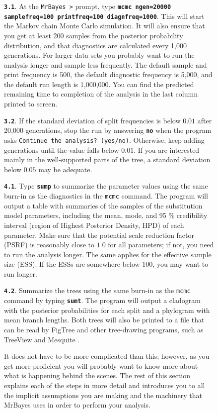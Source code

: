 \documentclass[12pt]{book}
\newcommand{\ttt}[1]{\texttt{#1}}
\newcommand{\tb}[1]{\ttt{\textbf{#1}}}
\begin{document}
\begin{figure}[h]
\tb{3.1}. At the \ttt{MrBayes >} prompt, type \tb{mcmc ngen=20000 samplefreq=100 printfreq=100
diagnfreq=1000}. This will start the Markov chain Monte Carlo simulation. It will also ensure that
you get at least 200 samples from the posterior probability distribution, and that diagnostics are
calculated every 1,000 generations. For larger data sets you probably want to run the analysis
longer and sample less frequently. The default sample and print frequency is 500, the default
diagnostic frequency is 5,000, and the default run length is 1,000,000. You can find the predicted
remaining time to completion of the analysis in the last column printed to screen.

\tb{3.2}. If the standard deviation of split frequencies is below $0.01$ after 20,000 generations,
stop the run by answering \tb{no} when the program asks \ttt{Continue the analysis? (yes/no)}.
Otherwise, keep adding generations until the value falls below $0.01$. If you are interested mainly
in the well-supported parts of the tree, a standard deviation below $0.05$ may be adequate.

\tb{4.1}. Type \tb{sump} to summarize the parameter values using the same burn-in as the
diagnostics in the \ttt{mcmc} command. The program will output a table with summaries of the
samples of the substitution model parameters, including the mean, mode, and 95 \% credibility
interval (region of Highest Posterior Density, HPD) of each parameter. Make sure that the potential
scale reduction factor (PSRF) is reasonably close to $1.0$ for all parameters; if not, you need to
run the analysis longer. The same applies for the effective sample size (ESS). If the ESSs are
somewhere below 100, you may want to run longer.

\tb{4.2}. Summarize the trees using the same burn-in as the \ttt{mcmc} command by typing \tb{sumt}.
The program will output a cladogram with the posterior probabilities for each split and a phylogram
with mean branch lengths. Both trees will also be printed to a file that can be read by FigTree
\citep{rambaut12} and other tree-drawing programs, such as TreeView \citep{page96} and Mesquite
\citep{maddison06}.

It does not have to be more complicated than this; however, as you get more proficient you will
probably want to know more about what is happening behind the scenes. The rest of this section
explains each of the steps in more detail and introduces you to all the implicit assumptions you
are making and the machinery that MrBayes uses in order to perform your analysis.


\end{figure}
\end{document}

